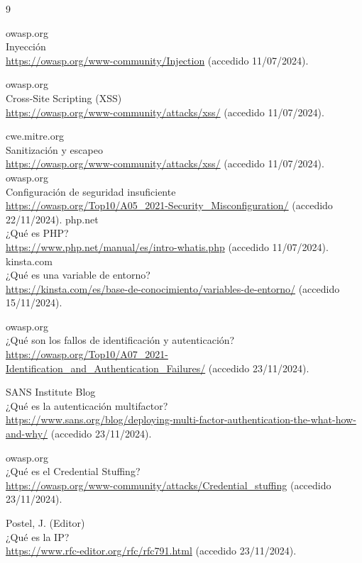 \documentclass[a4paper,12pt]{article}
\begin{document}
\begin{thebibliography}{9}
	
	

	 owasp.org\\
	Inyección\\ 
	\url{https://owasp.org/www-community/Injection} (accedido 11/07/2024).
	
	 owasp.org\\
	Cross-Site Scripting (XSS)\\ \url{https://owasp.org/www-community/attacks/xss/} (accedido 11/07/2024).
	 
	 cwe.mitre.org\\
	Sanitización y escapeo\\ \url{https://owasp.org/www-community/attacks/xss/} (accedido 11/07/2024). 
	 owasp.org\\ Configuración de seguridad insuficiente\\	\url{https://owasp.org/Top10/A05_2021-Security_Misconfiguration/} (accedido 22/11/2024).
	 php.net\\
	¿Qué es PHP?\\ \url{https://www.php.net/manual/es/intro-whatis.php} (accedido 11/07/2024).
	 kinsta.com\\ ¿Qué es una variable de entorno?\\	\url{https://kinsta.com/es/base-de-conocimiento/variables-de-entorno/} (accedido 15/11/2024).

     owasp.org\\
    ¿Qué son los fallos de identificación y autenticación?\\
    \url{https://owasp.org/Top10/A07_2021-Identification_and_Authentication_Failures/} (accedido 23/11/2024).

     SANS Institute Blog\\
    ¿Qué es la autenticación multifactor?\\
    \url{https://www.sans.org/blog/deploying-multi-factor-authentication-the-what-how-and-why/} (accedido 23/11/2024).

     owasp.org\\
    ¿Qué es el Credential Stuffing?\\
    \url{https://owasp.org/www-community/attacks/Credential_stuffing} (accedido 23/11/2024).

     Postel, J. (Editor)\\
    ¿Qué es la IP?\\
    \url{https://www.rfc-editor.org/rfc/rfc791.html} (accedido 23/11/2024).


\end{thebibliography}
\end{document}
